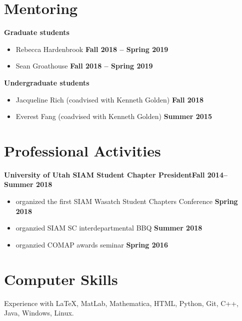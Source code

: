 \documentclass[margin,line]{res}
\begin{document}
\begin{resume}
\section{\sc Mentoring}
{\bf Graduate students}
\begin{itemize}
\item[ ] Rebecca Hardenbrook
\hfill {\bf Fall 2018 -- Spring 2019}
\item [] Sean Groathouse
\hfill {\bf Fall 2018 -- Spring 2019}
\end{itemize}
{\bf Undergraduate students}
\begin{itemize}
\item[ ] Jacqueline Rich (coadvised with Kenneth Golden) 
\hfill {\bf Fall 2018}
\item[ ] Everest Fang (coadvised with Kenneth Golden)
\hfill {\bf Summer 2015}
\end{itemize}

\section{\sc Professional Activities}
{\bf University of Utah SIAM Student Chapter President}\hfill{\bf Fall 2014--Summer 2018}\\
\begin{itemize}
\item[] organized the first SIAM Wasatch Student Chapters Conference
\hfill {\bf Spring 2018}
\item[] organzied SIAM SC interdepartmental BBQ
\hfill {\bf Summer 2018}
\item[] organzied COMAP awards seminar
\hfill {\bf Spring 2016}
\end{itemize}

\section{\sc Computer Skills} 
Experience with \LaTeX, MatLab, Mathematica, HTML, Python, Git, C++, Java, Windows, Linux.


\end{resume}
\end{document}
